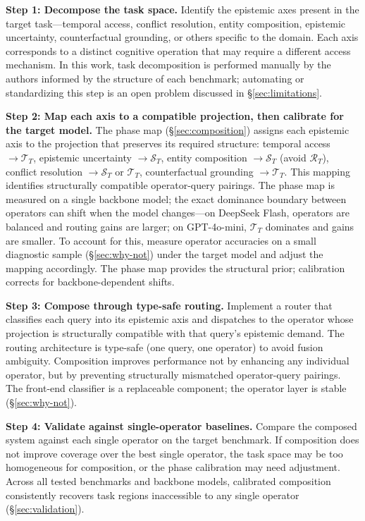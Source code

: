 \documentclass[letterpaper,twocolumn,10pt]{article}
\begin{document}
\textbf{Step 1: Decompose the task space.} Identify the epistemic axes present in the target task---temporal access, conflict resolution, entity composition, epistemic uncertainty, counterfactual grounding, or others specific to the domain. Each axis corresponds to a distinct cognitive operation that may require a different access mechanism. In this work, task decomposition is performed manually by the authors informed by the structure of each benchmark; automating or standardizing this step is an open problem discussed in \S\ref{sec:limitations}.

\textbf{Step 2: Map each axis to a compatible projection, then calibrate for the target model.} The phase map (\S\ref{sec:composition}) assigns each epistemic axis to the projection that preserves its required structure: temporal access $\rightarrow \mathcal{T}_T$, epistemic uncertainty $\rightarrow \mathcal{S}_T$, entity composition $\rightarrow \mathcal{S}_T$ (avoid $\mathcal{R}_T$), conflict resolution $\rightarrow \mathcal{S}_T$ or $\mathcal{T}_T$, counterfactual grounding $\rightarrow \mathcal{T}_T$. This mapping identifies structurally compatible operator-query pairings. The phase map is measured on a single backbone model; the exact dominance boundary between operators can shift when the model changes---on DeepSeek Flash, operators are balanced and routing gains are larger; on GPT-4o-mini, $\mathcal{T}_T$ dominates and gains are smaller. To account for this, measure operator accuracies on a small diagnostic sample (\S\ref{sec:why-not}) under the target model and adjust the mapping accordingly. The phase map provides the structural prior; calibration corrects for backbone-dependent shifts.

\textbf{Step 3: Compose through type-safe routing.} Implement a router that classifies each query into its epistemic axis and dispatches to the operator whose projection is structurally compatible with that query's epistemic demand. The routing architecture is type-safe (one query, one operator) to avoid fusion ambiguity. Composition improves performance not by enhancing any individual operator, but by preventing structurally mismatched operator-query pairings. The front-end classifier is a replaceable component; the operator layer is stable (\S\ref{sec:why-not}).

\textbf{Step 4: Validate against single-operator baselines.} Compare the composed system against each single operator on the target benchmark. If composition does not improve coverage over the best single operator, the task space may be too homogeneous for composition, or the phase calibration may need adjustment. Across all tested benchmarks and backbone models, calibrated composition consistently recovers task regions inaccessible to any single operator (\S\ref{sec:validation}).
\end{document}

